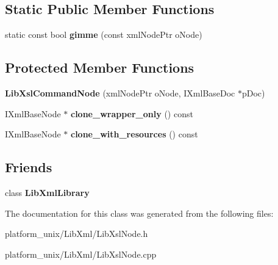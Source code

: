 \subsection*{\-Static \-Public \-Member \-Functions}
\begin{DoxyCompactItemize}
\item 
\hypertarget{classgeneral__server_1_1LibXslCommandNode_a1594b30c04c223c199f6123b4bd7157a}{static const bool {\bfseries gimme} (const xml\-Node\-Ptr o\-Node)}\label{classgeneral__server_1_1LibXslCommandNode_a1594b30c04c223c199f6123b4bd7157a}

\end{DoxyCompactItemize}
\subsection*{\-Protected \-Member \-Functions}
\begin{DoxyCompactItemize}
\item 
\hypertarget{classgeneral__server_1_1LibXslCommandNode_aff5e8c46cfddf255e5a009e62c166ec6}{{\bfseries \-Lib\-Xsl\-Command\-Node} (xml\-Node\-Ptr o\-Node, \-I\-Xml\-Base\-Doc $\ast$p\-Doc)}\label{classgeneral__server_1_1LibXslCommandNode_aff5e8c46cfddf255e5a009e62c166ec6}

\item 
\hypertarget{classgeneral__server_1_1LibXslCommandNode_a375f23d5c9323fffb3a8187628d89a14}{\-I\-Xml\-Base\-Node $\ast$ {\bfseries clone\-\_\-wrapper\-\_\-only} () const }\label{classgeneral__server_1_1LibXslCommandNode_a375f23d5c9323fffb3a8187628d89a14}

\item 
\hypertarget{classgeneral__server_1_1LibXslCommandNode_aa93819d5fa6fdd08506f9188ddaaceb2}{\-I\-Xml\-Base\-Node $\ast$ {\bfseries clone\-\_\-with\-\_\-resources} () const }\label{classgeneral__server_1_1LibXslCommandNode_aa93819d5fa6fdd08506f9188ddaaceb2}

\end{DoxyCompactItemize}
\subsection*{\-Friends}
\begin{DoxyCompactItemize}
\item 
\hypertarget{classgeneral__server_1_1LibXslCommandNode_ab76a8c8b514e08e13c811de729a94ce4}{class {\bfseries \-Lib\-Xml\-Library}}\label{classgeneral__server_1_1LibXslCommandNode_ab76a8c8b514e08e13c811de729a94ce4}

\end{DoxyCompactItemize}


\-The documentation for this class was generated from the following files\-:\begin{DoxyCompactItemize}
\item 
platform\-\_\-unix/\-Lib\-Xml/\-Lib\-Xsl\-Node.\-h\item 
platform\-\_\-unix/\-Lib\-Xml/\-Lib\-Xsl\-Node.\-cpp\end{DoxyCompactItemize}
